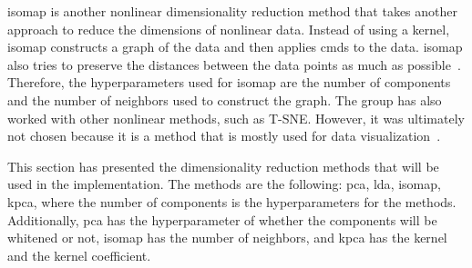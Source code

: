 \gls{isomap} is another nonlinear dimensionality reduction method that takes another approach to reduce the dimensions of nonlinear data. Instead of using a kernel, \gls{isomap} constructs a graph of the data and then applies \gls{cmds} to the data. \gls{isomap} also tries to preserve the distances between the data points as much as possible~\cite{dimensionality-reduction-comparative-review}. Therefore, the hyperparameters used for \gls{isomap} are the number of components and the number of neighbors used to construct the graph. The group has also worked with other nonlinear methods, such as T-SNE. However, it was ultimately not chosen because it is a method that is mostly used for data visualization~\cite{tsne-visualization}.


This section has presented the dimensionality reduction methods that will be used in the implementation. The methods are the following: \gls{pca}, \gls{lda}, \gls{isomap}, \gls{kpca}, where the number of components is the hyperparameters for the methods. Additionally, \gls{pca} has the hyperparameter of whether the components will be whitened or not, \gls{isomap} has the number of neighbors, and \gls{kpca} has the kernel and the kernel coefficient.

